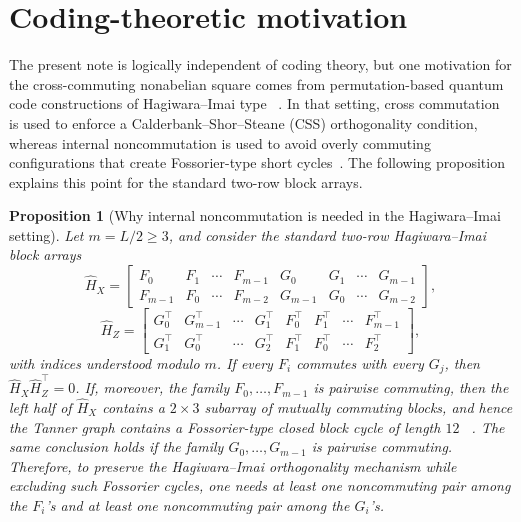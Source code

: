 \documentclass[11pt]{article}
\theoremstyle{uprightthm}
\newtheorem{proposition}[theorem]{Proposition}
\begin{document}
\appendix
\section{Coding-theoretic motivation}
The present note is logically independent of coding theory, but one motivation
for the cross-commuting nonabelian square comes from permutation-based quantum
code constructions of Hagiwara--Imai type
~\cite{HagiwaraImai2007,KasaiEtAl2011,Kasai2026}. In that setting, cross
commutation is used to enforce a Calderbank--Shor--Steane (CSS) orthogonality
condition, whereas internal
noncommutation is used to avoid overly commuting configurations that create
Fossorier-type short cycles~\cite{Fossorier2004}. The following proposition
explains this point for the standard two-row block arrays.

\begin{proposition}[Why internal noncommutation is needed in the
Hagiwara--Imai setting]
\label{prop:HI-necessity-en}
Let $m=L/2\ge 3$, and consider the standard two-row Hagiwara--Imai block arrays
\[
\hat H_X=
\begin{bmatrix}
F_0 & F_1 & \cdots & F_{m-1} & G_0 & G_1 & \cdots & G_{m-1}\\
F_{m-1} & F_0 & \cdots & F_{m-2} & G_{m-1} & G_0 & \cdots & G_{m-2}
\end{bmatrix},
\]
\[
\hat H_Z=
\begin{bmatrix}
G_0^\top & G_{m-1}^\top & \cdots & G_1^\top & F_0^\top & F_1^\top & \cdots & F_{m-1}^\top\\
G_1^\top & G_0^\top & \cdots & G_2^\top & F_1^\top & F_0^\top & \cdots & F_2^\top
\end{bmatrix},
\]
with indices understood modulo $m$. If every $F_i$ commutes with every $G_j$,
then $\hat H_X\hat H_Z^\top=0$. If, moreover, the family
$F_0,\dots,F_{m-1}$ is pairwise commuting, then the left half of $\hat H_X$
contains a $2\times 3$ subarray of mutually commuting blocks, and hence the
Tanner graph contains a Fossorier-type closed block cycle of length $12$
~\cite{Fossorier2004}. The same conclusion holds if the family
$G_0,\dots,G_{m-1}$ is pairwise commuting. Therefore, to preserve the
Hagiwara--Imai orthogonality mechanism while excluding such Fossorier cycles,
one needs at least one noncommuting pair among the $F_i$'s and at least one
noncommuting pair among the $G_i$'s.
\end{proposition}
\end{document}
